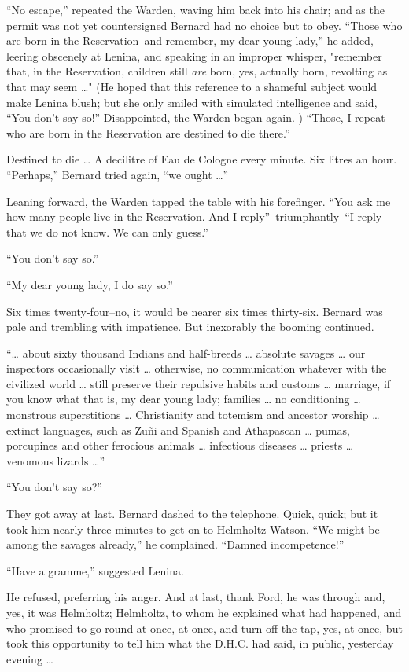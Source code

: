 \documentclass[12pt]{report}
\begin{document}
``No escape,'' repeated the Warden, waving him back into his chair; and
as the permit was not yet countersigned Bernard had no choice but to
obey. ``Those who are born in the Reservation--and remember, my dear
young lady,'' he added, leering obscenely at Lenina, and speaking in an
improper whisper, "remember that, in the Reservation, children still
\emph{are} born, yes, actually born, revolting as that may seem
\ldots{}" (He hoped that this reference to a shameful subject would make
Lenina blush; but she only smiled with simulated intelligence and said,
``You don't say so!'' Disappointed, the Warden began again. ) ``Those, I
repeat who are born in the Reservation are destined to die there.''

Destined to die \ldots{} A decilitre of Eau de Cologne every minute. Six
litres an hour. ``Perhaps,'' Bernard tried again, ``we ought \ldots{}''

Leaning forward, the Warden tapped the table with his forefinger. ``You
ask me how many people live in the Reservation. And I
reply''--triumphantly--``I reply that we do not know. We can only
guess.''

``You don't say so.''

``My dear young lady, I do say so.''

Six times twenty-four--no, it would be nearer six times thirty-six.
Bernard was pale and trembling with impatience. But inexorably the
booming continued.

``\ldots{} about sixty thousand Indians and half-breeds \ldots{}
absolute savages \ldots{} our inspectors occasionally visit \ldots{}
otherwise, no communication whatever with the civilized world \ldots{}
still preserve their repulsive habits and customs \ldots{} marriage, if
you know what that is, my dear young lady; families \ldots{} no
conditioning \ldots{} monstrous superstitions \ldots{} Christianity and
totemism and ancestor worship \ldots{} extinct languages, such as Zuñi
and Spanish and Athapascan \ldots{} pumas, porcupines and other
ferocious animals \ldots{} infectious diseases \ldots{} priests \ldots{}
venomous lizards \ldots{}''

``You don't say so?''

They got away at last. Bernard dashed to the telephone. Quick, quick;
but it took him nearly three minutes to get on to Helmholtz Watson. ``We
might be among the savages already,'' he complained. ``Damned
incompetence!''

``Have a gramme,'' suggested Lenina.

He refused, preferring his anger. And at last, thank Ford, he was
through and, yes, it was Helmholtz; Helmholtz, to whom he explained what
had happened, and who promised to go round at once, at once, and turn
off the tap, yes, at once, but took this opportunity to tell him what
the D.H.C. had said, in public, yesterday evening \ldots{}
\end{document}
